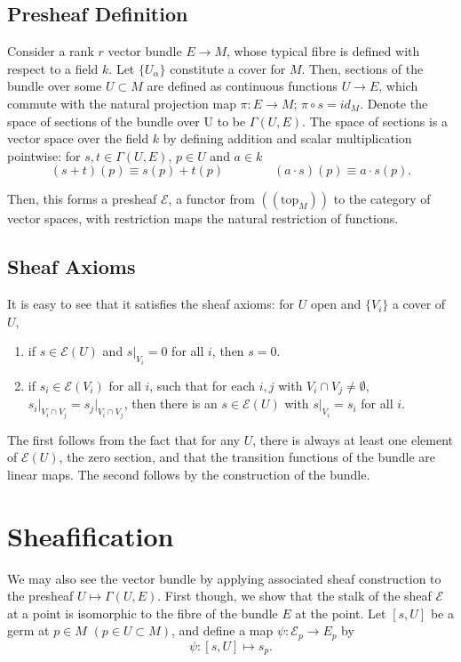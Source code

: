 \documentclass[12pt]{article}
\newcommand{\takes}[2]{\!:\!#1 \rightarrow #2}
\begin{document}
\subsection{Presheaf Definition}

Consider a rank $r$ vector bundle $E\rightarrow M$, whose typical fibre is defined with respect to a field $k$.  Let $\{U_\alpha\}$ constitute a cover
for $M$.  Then, sections of the bundle over some $U\subset M$ are defined
as continuous functions $U\rightarrow E$, which commute with the natural projection
map $\pi \takes E M$; $\pi \circ s = id_M$. Denote the space of sections of
the bundle over U to be $\Gamma(U,E)$.  The space of sections is a vector
space over the field $k$ by defining addition and scalar multiplication pointwise: for $s,t \in \Gamma(U,E)$, $p\in U$ and $a\in k$
\[ (s+t)(p) \equiv s(p) + t(p) \qquad \qquad (a \cdot s) (p) \equiv a \cdot s(p).\]

Then, this forms a presheaf $\mathcal E$, a functor from $((\text{top}_M))$
to the category of vector spaces, with restriction maps the natural
restriction of functions.

\subsection{Sheaf Axioms}
It is easy to see that it satisfies the sheaf
axioms: for $U$ open and $\{V_i\}$ a cover of $U$,

\begin{enumerate}
\item if $s\in \mathcal E(U)$ and $s\vert_{V_i} =0 $ for all $i$, then $s=0$.
\item if $s_i\in \mathcal E(V_i)$ for all $i$, such that for each $i,j$ with
$V_i\cap V_j \ne \emptyset$, $s_i\vert_{V_i\cap V_j} = s_j\vert_{V_i\cap
V_j}$, then there is an $s \in \mathcal E(U)$ with $s\vert_{V_i} = s_i$ for
all $i$.
\end{enumerate}

The first follows from the fact that for any $U$, there is always at least
one element of $\mathcal E(U)$, the zero section, and that the transition
functions of the bundle are linear maps. The second follows by the construction of the bundle.\\

\section{Sheafification}

We may also see the vector bundle by applying associated sheaf construction
to the presheaf $U \mapsto \Gamma(U,E)$.  First though, we show that the
stalk of the sheaf $\mathcal E$ at a point is isomorphic to the fibre of the
bundle $E$ at the point.  Let $[s,U]$ be a germ at $p\in M$ $(p\in U
\subset M)$, and define a map $\psi \takes{\mathcal E_p}{ E_p}$ by
\[\psi:[s,U] \mapsto s_p.\]
\end{document}
